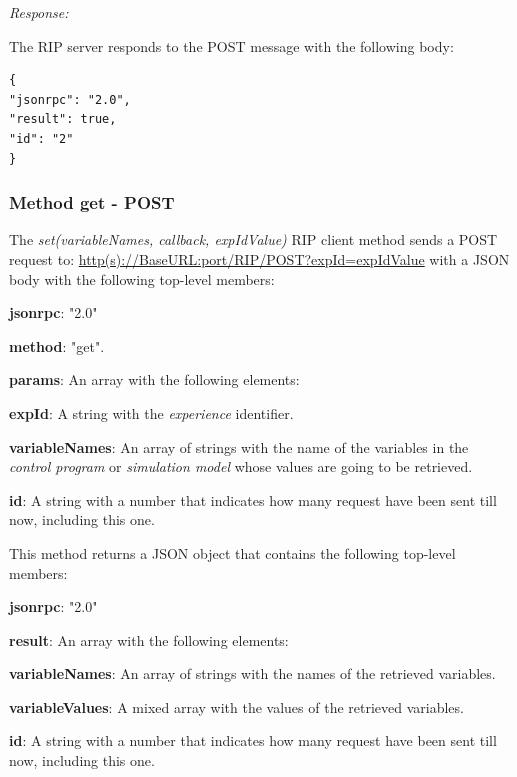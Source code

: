 \textit{Response:}

The RIP server responds to the POST message with the following body:

\begin{lstlisting}
{
"jsonrpc": "2.0",
"result": true,
"id": "2"
}
\end{lstlisting}

\subsubsection{Method get - POST}
The \textit{set(variableNames, callback, expIdValue)} RIP client method sends a POST request to: \url{http(s)://BaseURL:port/RIP/POST?expId=expIdValue} with a JSON body with the following top-level members:

\begin{myEnumerate}
    \item \textbf{jsonrpc}: "2.0"
    \item \textbf{method}: "get".
    \item \textbf{params}: An array with the following elements:
    \begin{myEnumerate}
        \item \textbf{expId}: A string with the \textit{experience} identifier.
        \item \textbf{variableNames}: An array of strings with the name of the variables in the \textit{control program} or \textit{simulation model} whose values are going to be retrieved.
    \end{myEnumerate}
    \item \textbf{id}: A string with a number that indicates how many request have been sent till now, including this one.
\end{myEnumerate}

This method returns a JSON object that contains the following top-level members:

\begin{myEnumerate}
    \item \textbf{jsonrpc}: "2.0"
    \item \textbf{result}: An array with the following elements:
    \begin{myEnumerate}
        \item \textbf{variableNames}: An array of strings with the names of the retrieved variables.
        \item \textbf{variableValues}: A mixed array with the values of the retrieved variables.
    \end{myEnumerate}
    \item \textbf{id}: A string with a number that indicates how many request have been sent till now, including this one.
\end{myEnumerate}

